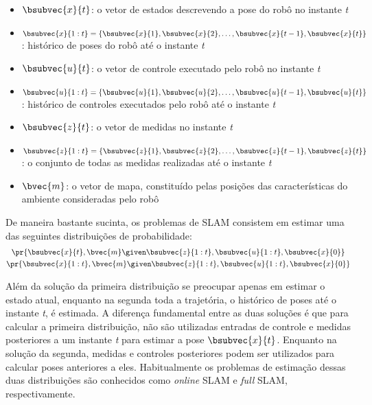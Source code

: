 \begin{itemize}
  \item $\bsubvec{x}{t}$: o vetor de estados descrevendo a pose do robô no instante \emph{t}
  \item $\bsubvec{x}{1:t} = \{ \bsubvec{x}{1}, \bsubvec{x}{2}, \dots, 
  \bsubvec{x}{t-1}, \bsubvec{x}{t} \}$: histórico de poses do robô até o instante \emph{t}
  \item $\bsubvec{u}{t}$: o vetor de controle executado pelo robô no instante \emph{t}
  \item $\bsubvec{u}{1:t} = \{ \bsubvec{u}{1}, \bsubvec{u}{2}, \dots, 
  \bsubvec{u}{t-1}, \bsubvec{u}{t} \}$: histórico de controles executados pelo robô até o instante \emph{t}
  \item $\bsubvec{z}{t}$: o vetor de medidas no instante \emph{t}
  \item $\bsubvec{z}{1:t} = \{ \bsubvec{z}{1}, \bsubvec{z}{2}, \dots, 
  \bsubvec{z}{t-1}, \bsubvec{z}{t} \}$: o conjunto de todas as medidas realizadas até o instante \emph{t}
  \item $\bvec{m}$: o vetor de mapa, constituído pelas posições das características do ambiente consideradas pelo robô
\end{itemize}

De maneira bastante sucinta, os problemas de SLAM consistem em estimar uma das 
seguintes distribuições de probabilidade:
\begin{gather}
  \pr{\bsubvec{x}{t}, \bvec{m} \given \bsubvec{z}{1:t} , \bsubvec{u}{1:t}, 
    \bsubvec{x}{0}}
  \label{eq:online-slam-probability} \\
  \pr{\bsubvec{x}{1:t}, \bvec{m} \given \bsubvec{z}{1:t} , \bsubvec{u}{1:t}, 
    \bsubvec{x}{0}}
  \label{eq:full-slam-probability}
\end{gather}

Além da solução da primeira distribuição se preocupar apenas em estimar o 
estado atual, enquanto na segunda toda a trajetória, o histórico de 
poses até o instante \emph{t}, é estimada. A diferença fundamental entre as 
duas soluções é que para calcular a primeira distribuição, não são utilizadas entradas de controle e medidas posteriores a um instante 
\emph{t} para estimar a pose $\bsubvec{x}{t}$. Enquanto na 
solução da segunda, medidas e controles posteriores podem ser utilizados para 
calcular poses anteriores a eles. Habitualmente os problemas de estimação 
dessas duas distribuições são conhecidos como \textit{online} SLAM e 
\textit{full} SLAM, respectivamente. 

